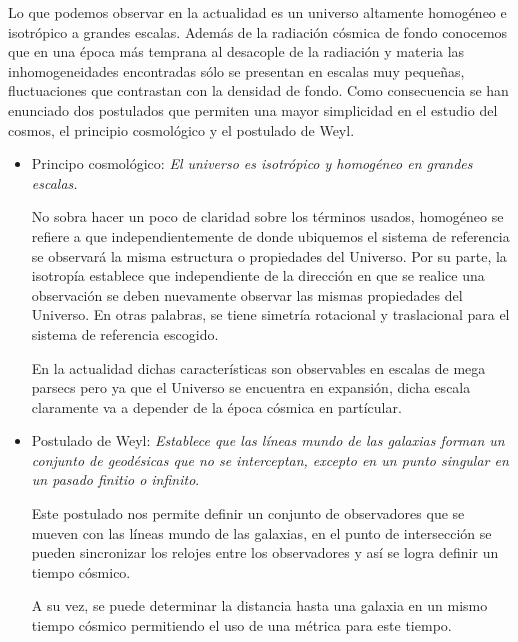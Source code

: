 Lo que podemos observar en la actualidad es un universo altamente homogéneo 
e isotrópico a grandes escalas. Además de la radiación cósmica de fondo 
conocemos que en una época más temprana al desacople de la radiación y materia
las inhomogeneidades encontradas sólo se presentan en escalas muy pequeñas, 
fluctuaciones que contrastan con la densidad de fondo.  
Como consecuencia se han enunciado dos postulados que permiten  una mayor 
simplicidad en el estudio del cosmos, el principio cosmológico y el postulado 
de Weyl. 

\begin{itemize}
\item Principo cosmol\'ogico: \emph{El universo es isotr\'opico y homog\'eneo 
en grandes escalas.}

No sobra hacer un poco de claridad sobre los términos usados, homogéneo se 
refiere a que independientemente de donde ubiquemos el sistema de referencia se 
observará la misma estructura o propiedades del Universo. Por su parte, la
isotropía establece que independiente de la dirección en que se realice una 
observación se deben nuevamente observar las mismas propiedades del Universo. 
En otras palabras, se tiene simetría rotacional y traslacional para el sistema
de referencia escogido. 

En la actualidad dichas características son observables en escalas de mega parsecs
pero ya que el Universo se encuentra en expansión, dicha escala claramente 
va a depender de la época cósmica en partícular. 


\item Postulado de Weyl:\emph{ Establece que las líneas mundo de las galaxias forman 
un conjunto de geodésicas que no se interceptan, excepto en un punto singular en un 
pasado finitio o infinito}. 

Este postulado nos permite definir un conjunto de observadores que se mueven con 
las líneas mundo de las galaxias, en el punto de intersección se pueden sincronizar 
los relojes entre los observadores y así se logra definir un tiempo cósmico. 

A su vez, se puede determinar la distancia hasta una galaxia en un mismo tiempo 
cósmico permitiendo el uso de una métrica para este tiempo.  

\end{itemize}

